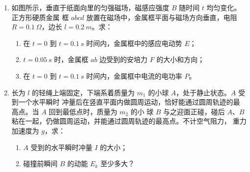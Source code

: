 \begin{enumerate}
\begin{enumerate}
\begin{enumerate}
\end{enumerate}





\end{enumerate}





\gaokaojs

\item
如图所示，垂直于纸面向里的匀强磁场，磁感应强度 $ B $ 随时间 $ t $ 均匀变化。正方形硬质金属
框 $ abcd $ 放置在磁场中，金属框平面与磁场方向垂直，电阻 $ R=0.1 \ \Omega $，边长 $ l=0.2 \ m $。求：
\begin{enumerate}
\item
在 $ t=0 $ 到 $ t=0.1 \ s $ 时间内，金属框中的感应电动势 $ E $；
\item 
$ t=0.05 \ s $ 时，金属框 $ ab $ 边受到的安培力 $ F $ 的大小和方向；
\item 
在 $ t=0 $ 到 $ t=0.1 \ s $ 时间内，金属框中电流的电功率 $ P $。

\end{enumerate}
\begin{figure}[h!]
\flushright
\begin{subfigure}{0.4\linewidth}
\centering
 
\caption{}\label{}
\end{subfigure}
\begin{subfigure}{0.4\linewidth}
\centering
 
\caption{}\label{}
\end{subfigure}
\end{figure}






\item
长为 $ l $ 的轻绳上端固定，下端系着质量为 $ m_{1} $ 的小球 $ A $，处于静止状态。$ A $ 受到一个水平瞬时
冲量后在竖直平面内做圆周运动，恰好能通过圆周轨迹的最高点。当 $ A $ 回到最低点时，质量为 $ m_{2} $ 的小
球 $ B $ 与之迎面正碰，碰后 $ A $、$ B $ 粘在一起，仍做圆周运动，并能通过圆周轨迹的最高点。不计空气阻力，重力加速度为 $ g $，求：
\begin{enumerate}
\item
$ A $ 受到的水平瞬时冲量 $ I $ 的大小；
\item 
碰撞前瞬间 $ B $ 的动能 $ E_{k} $ 至少多大？
\end{enumerate}



\end{enumerate}
